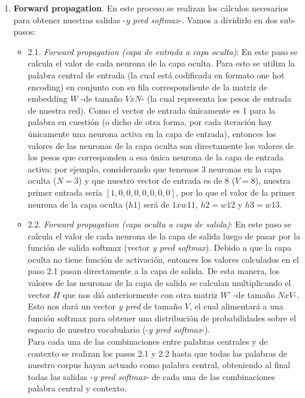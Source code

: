 \documentclass[12pt,a4paper]{article}
\begin{document}
\begin{sloppypar}
\begin{enumerate}
\item \textbf{Forward propagation}. En este proceso se realizan los cálculos necesarios para obtener nuestras salidas -\textit{y pred softmax}-. Vamos a dividirlo en dos sub-pasos:

\begin{itemize}

\item 2.1. \textit{Forward propagation (capa de entrada a capa oculta)}: En este paso se calcula el valor de cada neurona de la capa oculta. Para esto se utiliza la palabra central de entrada (la cual está codificada en formato one hot encoding) en conjunto con su fila correspondiente de la matriz de embedding $W$ -de tamaño $V x N$- (la cual representa los pesos de entrada de nuestra red). Como el vector de entrada únicamente es 1 para la palabra en cuestión (o dicho de otra forma, por cada iteración hay únicamente una neurona activa en la capa de entrada), entonces los valores de las neuronas de la capa oculta son directamente los valores de los pesos que corresponden a esa única neurona de la capa de entrada activa: por ejemplo, considerando que tenemos 3 neuronas en la capa oculta ($N=3$) y que nuestro vector de entrada es de 8 ($V=8$), nuestra primer entrada sería $[1,0,0,0,0,0,0,0]$, por lo que el valor de la primer neurona de la capa oculta ($h1$) será de $1 x w11$, $h2 = w12$ y $h3 = w13$.

\item 2.2. \textit{Forward propagation (capa oculta a capa de salida)}: En este paso se calcula el valor de cada neurona de la capa de salida luego de pasar por la función de salida softmax (vector \textit{y pred softmax}).  Debido a que la capa oculta no tiene función de activación, entonces los valores calculados en el paso 2.1 pasan directamente a la capa de salida. De esta manera, los valores de las neuronas de la capa de salida se calculan multiplicando el vector $H$ que nos dió anteriormente con otra matriz $W’$ -de tamaño $N x V$-. Esto nos dará un vector \textit{y pred} de tamaño $V$, el cual alimentará a una función softmax para obtener una distribución de probabilidades sobre el espacio de nuestro vocabulario (-\textit{y pred softmax}-). 
\\

Para cada una de las combinaciones entre palabras centrales y de contexto se realizan los pasos 2.1 y 2.2 hasta que todas las palabras de nuestro corpus hayan actuado como palabra central, obteniendo al final todas las salidas -\textit{y pred softmax}- de cada una de las combinaciones palabra central y contexto. 


\end{itemize}
\end{enumerate}
\end{sloppypar}
\end{document}
